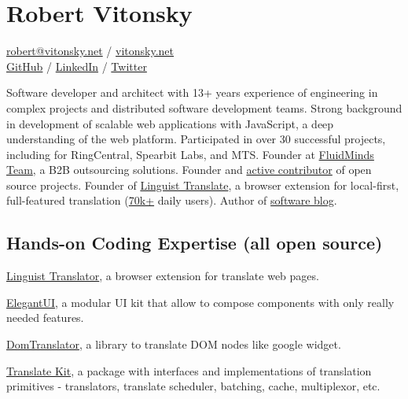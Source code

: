 \documentclass{vitonsky}
\begin{document}
\vitonskyPrintPhoto{}

\section*{\Large{Robert Vitonsky}}

\href{mailto:robert@vitonsky.net}{robert@vitonsky.net} / \href{https://vitonsky.net}{vitonsky.net}\\%
\href{https://github.com/vitonsky}{GitHub} /
\href{https://www.linkedin.com/in/vitonsky}{LinkedIn} /
\href{https://twitter.com/intent/follow?screen_name=rvitonsky}{Twitter}

\vspace*{12pt}

Software developer and architect with 13+ years experience of engineering in complex projects and distributed software development teams. Strong background in development of scalable web applications with JavaScript, a deep understanding of the web platform. Participated in over 30 successful projects, including for RingCentral, Spearbit Labs, and MTS. Founder at \href{mailto:contact@fluidminds.org}{FluidMinds Team}, a B2B outsourcing solutions. Founder and \href{https://github.com/vitonsky}{active contributor} of open source projects. Founder of \href{https://linguister.io}{Linguist Translate}, a browser extension for local-first, full-featured translation (\href{https://chrome.google.com/webstore/detail/gbefmodhlophhakmoecijeppjblibmie}{70k+} daily users). Author of \href{https://vitonsky.net/}{software blog}.

\subsection*{Hands-on Coding Expertise (all open source)}

\href{https://github.com/translate-tools/linguist}{Linguist Translator}, a browser
extension for translate web pages.

\href{https://github.com/vitonsky/react-elegant-ui}{ElegantUI}, a
modular UI kit that allow to compose components with only really needed features.

\href{https://github.com/translate-tools/domtranslator}{DomTranslator}, a library to translate DOM nodes like google widget.

\href{https://github.com/translate-tools/core}{Translate Kit}, a package with interfaces and implementations of translation primitives - translators, translate scheduler, batching, cache, multiplexor, etc.
\end{document}
